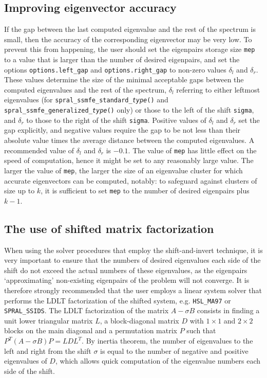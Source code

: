 \subsection{Improving eigenvector accuracy}

If the gap %
between the last computed eigenvalue 
and the rest of the spectrum is small,
then the accuracy of the corresponding eigenvector may be very low.
To prevent this from happening,
the user should set the eigenpairs storage size {\tt mep}
to a value that is larger than the number of desired eigenpairs,
and set the options 
{\tt options.left\_gap}
and
{\tt options.right\_gap}
to non-zero values $\delta_l$ and $\delta_r$.
These values
determine the size of the minimal acceptable gaps
between the computed eigenvalues and the rest of the spectrum,
$\delta_l$ referring to either leftmost eigenvalues
(for {\tt spral\_ssmfe\_standard\_\textit{type}()} and {\tt spral\_ssmfe\_generalized\_\textit{type}()} only)
or those to the left of the shift {\tt sigma},
and $\delta_r$
to those to the right of the shift {\tt sigma}.
Positive values of $\delta_l$ and $\delta_r$
set the gap explicitly,
and negative values
require the gap to be not less than their absolute value times
the average distance between the computed eigenvalues.
A recommended value of $\delta_l$ and $\delta_r$ is $-0.1$.
The value of {\tt mep} %
has little effect on
the speed of computation,
hence it might be set to any reasonably large value.
The larger the value of {\tt mep}, 
the larger the size of an eigenvalue cluster
for which accurate eigenvectors can be computed, notably:
to safeguard against clusters of size up to $k$,
it is sufficient to set {\tt mep} to the number of desired eigenpairs
plus $k - 1$.

\subsection{The use of shifted matrix factorization}
\label{sec:si}

When using the solver procedures that employ the shift-and-invert technique,
it is very important to ensure that the numbers of desired eigenvalues
each side of the shift do not exceed the actual numbers of these eigenvalues,
as the eigenpairs `approximating' non-existing eigenpairs of the problem
will not converge.
It is therefore strongly recommended that the user employs 
a linear system solver that performs
the LDLT
factorization of %
the shifted system,
e.g. {\tt HSL\_MA97} or {\tt SPRAL\_SSIDS}.
The LDLT factorization of the matrix
$A - \sigma B$ consists in finding a unit lower triangular
matrix $L$, a block-diagonal matrix $D$
with $1\times 1$ and $2\times 2$ blocks on the main diagonal
and a permutation matrix $P$
such that $P^T(A - \sigma B)P = L D L^T$.
By inertia theorem,
the number of eigenvalues to the left and right from 
the shift $\sigma$
is equal to the number of negative and positive eigenvalues of $D$,
which allows quick computation of the eigenvalue numbers
each side of the shift. %

